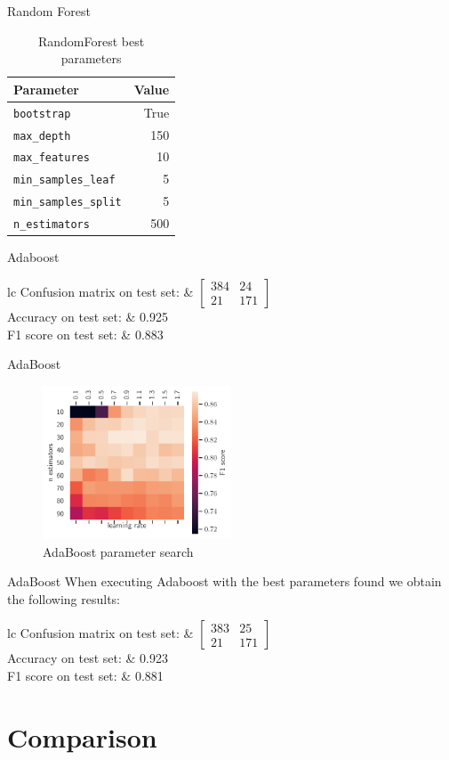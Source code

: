 \documentclass[aspectratio=169]{beamer}
\newcommand{\fresults}[3]{
\begin{table}[H]
\centering
\begin{tabular}{lc}
Confusion matrix on test set: & \( \begin{bmatrix} #1 \end{bmatrix} \) \\
    \addlinespace[0.5em]
    Accuracy on test set: & #2 \\
    F1 score on test set: & #3
\end{tabular}
\end{table}
}
\begin{document}
\begin{frame}{Random Forest}
\begin{table}[H]
\centering
\caption{RandomForest best parameters}
\begin{tabular}{lr}
\toprule
Parameter & Value \\
\midrule
\texttt{bootstrap} & True \\
\texttt{max\_depth} & 150 \\
\texttt{max\_features} & 10 \\
\texttt{min\_samples\_leaf} & 5 \\
\texttt{min\_samples\_split} & 5 \\
\texttt{n\_estimators} & 500 \\
\bottomrule
\end{tabular}
\end{table}
\end{frame}

\begin{frame}{Adaboost}
\fresults{ 384 &  24 \\ 21 & 171 }{0.925}{0.883}
\end{frame}

\begin{frame}{AdaBoost}
\begin{figure}[H]
\centering
\includegraphics[width=0.5\textwidth]{boosting}
\caption{AdaBoost parameter search}%
\label{fig:boosting}
\end{figure}

\end{frame}
\begin{frame}{AdaBoost}
When executing Adaboost with the best parameters found we obtain the following results:

\fresults{ 383 &  25 \\ 21 & 171 }{0.923}{0.881}
\end{frame}

\section{Comparison}
\end{document}
